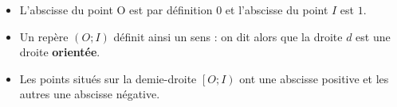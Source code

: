 \begin{itemize}
\item L'abscisse du point O est par définition $0$ et l'abscisse du point $I$ est $1$.
\item Un repère $\left(O;I\right)$ définit ainsi un \og sens \fg{} : on dit alors que la droite $d$ est une droite \textbf{orientée}.
\item Les points situés sur la demie-droite $\left[O;I\right)$ ont une abscisse positive et les autres une abscisse négative.
\end{itemize}


